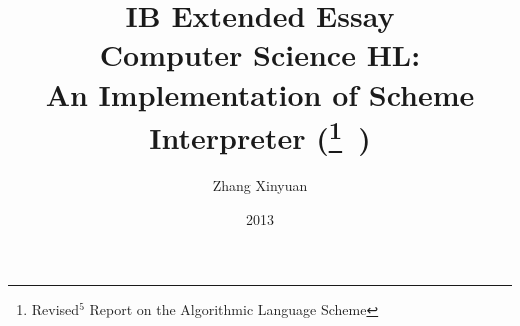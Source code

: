 \documentclass[a4paper]{article}
\title{
IB Extended Essay\\
Computer Science HL:\\
An Implementation of Scheme Interpreter
(\RFIVERS$\!\!$\footnote{Revised$^5$ Report on the Algorithmic Language Scheme}~)
}
\author{Zhang Xinyuan}
\date{2013}
\begin{document}


\maketitle

\newpage


\tableofcontents

% 






\begin{comment}
Hello, this is a test.

And test for math formula:

$$\int_0^1{f(t)e^{-2i\pi{}kt}}$$

And inlines: $\phi = \frac{\sqrt{5}\pm 1}{2}$

Test foot\footnote{this is a footnote.}note.

\underline{underline} is good, either \textit{itatlic} and
\emph{emphasis}.


try \verb verb texts

done.
\end{comment}
\end{document}
